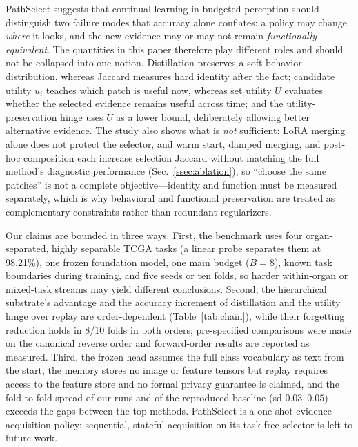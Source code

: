 \documentclass{article}
\begin{document}
PathSelect suggests that continual learning in budgeted perception should distinguish two failure modes that accuracy alone conflates: a policy may change \emph{where} it looks, and the new evidence may or may not remain \emph{functionally equivalent}. The quantities in this paper therefore play different roles and should not be collapsed into one notion. Distillation preserves a soft behavior distribution, whereas Jaccard measures hard identity after the fact; candidate utility $u_i$ teaches which patch is useful now, whereas set utility $U$ evaluates whether the selected evidence remains useful across time; and the utility-preservation hinge uses $U$ as a lower bound, deliberately allowing better alternative evidence. The study also shows what is \emph{not} sufficient: LoRA merging alone does not protect the selector, and warm start, damped merging, and post-hoc composition each increase selection Jaccard without matching the full method's diagnostic performance (Sec.~\ref{ssec:ablation}), so ``choose the same patches'' is not a complete objective---identity and function must be measured separately, which is why behavioral and functional preservation are treated as complementary constraints rather than redundant regularizers.

Our claims are bounded in three ways. First, the benchmark uses four organ-separated, highly separable TCGA tasks (a linear probe separates them at 98.21\%), one frozen foundation model, one main budget ($B=8$), known task boundaries during training, and five seeds or ten folds, so harder within-organ or mixed-task streams may yield different conclusions. Second, the hierarchical substrate's advantage and the accuracy increment of distillation and the utility hinge over replay are order-dependent (Table~\ref{tab:chain}), while their forgetting reduction holds in 8/10 folds in both orders; pre-specified comparisons were made on the canonical reverse order and forward-order results are reported as measured. Third, the frozen head assumes the full class vocabulary as text from the start, the memory stores no image or feature tensors but replay requires access to the feature store and no formal privacy guarantee is claimed, and the fold-to-fold spread of our runs and of the reproduced baseline (sd $0.03$--$0.05$) exceeds the gaps between the top methods. PathSelect is a one-shot evidence-acquisition policy; sequential, stateful acquisition on its task-free selector is left to future work.

\end{document}

